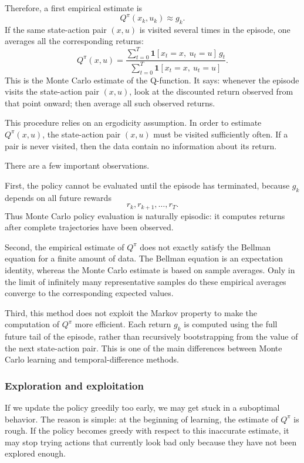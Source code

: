 Therefore, a first empirical estimate is
\[
Q^\pi(x_k,u_k)
\approx
g_k.
\]
If the same state-action pair \((x,u)\) is visited several times in the episode, one averages all
the corresponding returns:
\[
Q^\pi(x,u)
=
\frac{
\sum_{t=0}^{T}\mathbf{1}[x_t=x,\ u_t=u]\,g_t
}{
\sum_{t=0}^{T}\mathbf{1}[x_t=x,\ u_t=u]
}.
\]
This is the Monte Carlo estimate of the Q-function. It says: whenever the episode visits the
state-action pair \((x,u)\), look at the discounted return observed from that point onward; then
average all such observed returns.

This procedure relies on an ergodicity assumption. In order to estimate \(Q^\pi(x,u)\), the
state-action pair \((x,u)\) must be visited sufficiently often. If a pair is never visited, then the
data contain no information about its return.

There are a few important observations.

First, the policy cannot be evaluated until the episode has terminated, because \(g_k\) depends
on all future rewards
\[
r_k,r_{k+1},\dots,r_T.
\]
Thus Monte Carlo policy evaluation is naturally episodic: it computes returns after complete
trajectories have been observed.

Second, the empirical estimate of \(Q^\pi\) does not exactly satisfy the Bellman equation for a
finite amount of data. The Bellman equation is an expectation identity, whereas the Monte Carlo
estimate is based on sample averages. Only in the limit of infinitely many representative samples
do these empirical averages converge to the corresponding expected values.

Third, this method does not exploit the Markov property to make the computation of \(Q^\pi\)
more efficient. Each return \(g_k\) is computed using the full future tail of the episode, rather
than recursively bootstrapping from the value of the next state-action pair. This is one of the
main differences between Monte Carlo learning and temporal-difference methods.

\subsubsection{Exploration and exploitation}

If we update the policy greedily too early, we may get stuck in a suboptimal behavior. The reason
is simple: at the beginning of learning, the estimate of \(Q^\pi\) is rough. If the policy becomes
greedy with respect to this inaccurate estimate, it may stop trying actions that currently look
bad only because they have not been explored enough.

